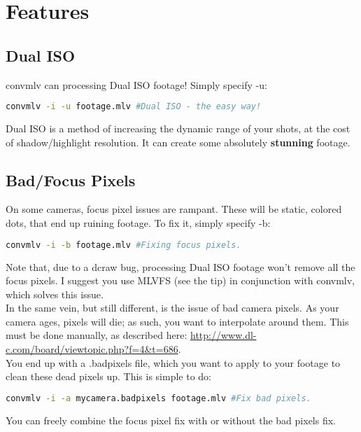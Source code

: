 \documentclass[a4paper,12pt]{article}
\begin{document}
\section{Features}
	\subsection{Dual ISO}
		convmlv can processing Dual ISO footage! Simply specify -u:

\begin{lstlisting}[language=bash]
	convmlv -i -u footage.mlv #Dual ISO - the easy way!
\end{lstlisting}

	Dual ISO is a method of increasing the dynamic range of your shots, at the cost of shadow/highlight resolution. It can create some
	absolutely \textbf{stunning} footage.

	\subsection{Bad/Focus Pixels}
		On some cameras, focus pixel issues are rampant. These will be static, colored dots, that end up ruining footage. To fix it, simply specify -b:
		
\begin{lstlisting}[language=bash]
	convmlv -i -b footage.mlv #Fixing focus pixels.
\end{lstlisting}

		Note that, due to a dcraw bug, processing Dual ISO footage won't remove all the focus pixels. I suggest you use MLVFS (see the tip) in conjunction with convmlv,
		which solves this issue.\\
		
		In the same vein, but still different, is the issue of bad camera pixels. As your camera ages, pixels will die; as such, you want to interpolate around
		them. This must be done manually, as described here: \url{http://www.dl-c.com/board/viewtopic.php?f=4&t=686}.\\
		
		You end up with a .badpixels file, which you want to apply to your footage to clean these dead pixels up. This is simple to do:
		
\begin{lstlisting}[language=bash]
	convmlv -i -a mycamera.badpixels footage.mlv #Fix bad pixels.
\end{lstlisting}
		
		You can freely combine the focus pixel fix with or without the bad pixels fix.
		
\end{document}
